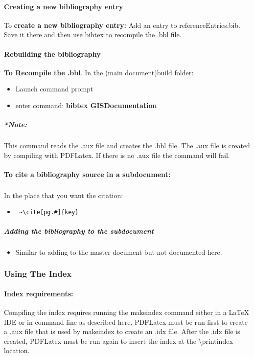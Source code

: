 \documentclass[class=book , crop=false]{standalone}
\begin{document}
\paragraph{Creating a new bibliography entry}
To \textbf{create a new bibliography entry:} Add an entry to referenceEntries.bib.  Save it there and then use bibtex to recompile the .bbl file.
\paragraph{Rebuilding the bibliography}
\textbf{To Recompile the .bbl}.  In the (main document)build folder:
\begin{itemize}
\item Launch command prompt
\item enter command: \textbf{{\large bibtex GISDocumentation}}
\end{itemize}
\subparagraph*{*Note:} {\footnotesize This command reads the .aux file and creates the .bbl file.  The .aux file is created by compiling with PDFLatex.  If there is no .aux file the command will fail.}

\paragraph{To cite a bibliography source in a subdocument:}
\subparagraph{}In the place that you want the citation:
\begin{itemize}
\item \begin{verbatim} ~\cite[pg.#]{key}\end{verbatim}
\end{itemize}
\subparagraph{Adding the bibliography to the subdocument}
\begin{itemize}
\item Similar to adding to the master document but not documented here.
\end{itemize}


\subsubsection[Using The Index]{{\Large Using The Index}}
\paragraph{Index requirements:}
Compiling the index requires running the makeindex command either in a \LaTeX{} IDE or in command line as described here.  PDFLatex must be run first to create a .aux file that is used by makeindex to create an .idx file.  After the .idx file is created, PDFLatex must be run again to insert the index at the \textbackslash printindex location.
\end{document}
